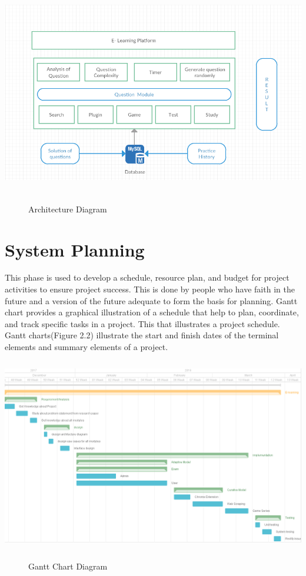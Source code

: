 \begin{center}
	\includegraphics[width=14.5cm,
	height=9.0cm]{architecture1.png}
	\begin{figure}[h!]
		\centering
		\caption{Architecture Diagram}%
	\end{figure}
\end{center}
\section{System Planning}
This phase is used to develop a schedule, resource plan, and budget for project activities to ensure project success. This is done by people who have faith in the future and a version of the future adequate to form the basis for planning. Gantt chart provides a graphical illustration of a schedule that help to plan, coordinate, and track specific tasks in a project. This that illustrates a project schedule. Gantt charts(Figure 2.2) illustrate the start and finish dates of the terminal elements and summary elements of a project.
\begin{center}
	\includegraphics[width=13.5cm, height=8.5cm]{gantt_chart.png}
	\begin{figure}[h!]
		\centering
		\caption{Gantt Chart Diagram}%
	\end{figure}
\end{center}
